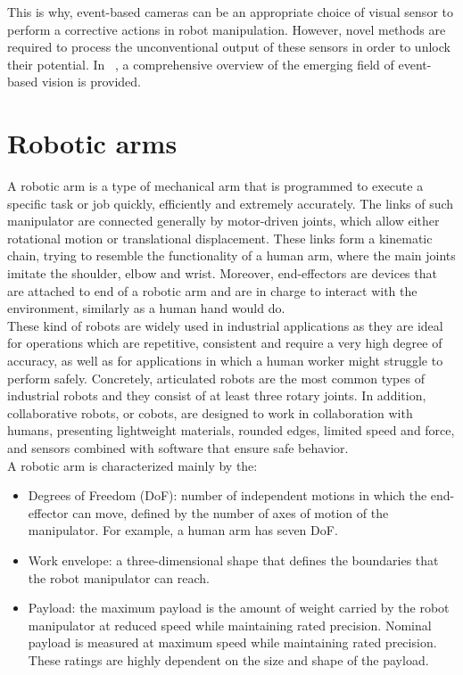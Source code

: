 This is why, event-based cameras can be an appropriate choice of visual sensor to perform a corrective actions in robot manipulation. However, novel methods are required to process the unconventional output of these sensors in order to unlock their potential. In ~\cite{gallego2020}, a comprehensive overview of the emerging field of event-based vision is provided.

\section{Robotic arms}

A robotic arm is a type of mechanical arm that is programmed to execute a specific task or job quickly, efficiently and extremely accurately. The links of such manipulator are connected generally by motor-driven joints, which allow either rotational motion or translational displacement. These links form a kinematic chain, trying to resemble the functionality of a human arm, where the main joints imitate the shoulder, elbow and wrist. Moreover, end-effectors are devices that are attached to end of a robotic arm and are in charge to interact with the environment, similarly as a human hand would do.\\

These kind of robots are widely used in industrial applications as they are ideal for operations which are repetitive, consistent and require a very high degree of accuracy, as well as for applications in which a human worker might struggle to perform safely. Concretely, articulated robots are the most common types of industrial robots and they consist of at least three rotary joints. In addition, collaborative robots, or cobots, are designed to work in collaboration with humans, presenting lightweight materials, rounded edges, limited speed and force, and sensors combined with software that ensure safe behavior.\\

A robotic arm is characterized mainly by the:

\begin{itemize}
	\item Degrees of Freedom (DoF): number of independent motions in which the end-effector can move, defined by the number of axes of motion of the manipulator. For example, a human arm has seven DoF.
	\item Work envelope: a three-dimensional shape that defines the boundaries that the robot manipulator can reach.
	\item Payload: the maximum payload is the amount of weight carried by the robot manipulator at reduced speed while maintaining rated precision. Nominal payload is measured at maximum speed while maintaining rated precision. These ratings are highly dependent on the size and shape of the payload. 
\end{itemize}

